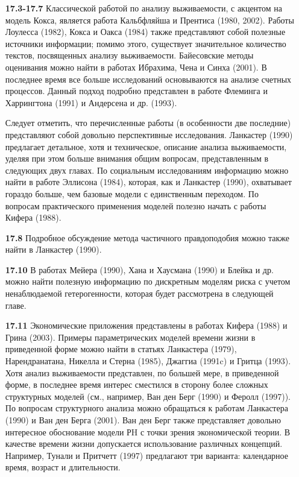 \begin{itemize}

    \item[\textbf{17.3-17.7}]
Классической работой по анализу выживаемости, с акцентом на модель Кокса, является работа Кальбфляйша и Прентиса (1980, 2002). Работы Лоулесса (1982), Кокса и Оакса (1984) также представляют собой полезные источники информации; помимо этого, существует значительное количество текстов, посвященных анализу выживаемости. Байесовские методы оценивания можно найти в работах Ибрахима, Чена и Синха (2001). В последнее время все больше исследований основываются на анализе счетных процессов. Данный подход подробно представлен в работе Флеминга и Харрингтона (1991) и Андерсена и др. (1993).

Следует отметить, что перечисленные работы (в особенности две последние) представляют собой довольно перспективные исследования. Ланкастер (1990) предлагает детальное, хотя и техническое, описание анализа выживаемости, уделяя при этом больше внимания общим вопросам, представленным в следующих двух главах. По социальным исследованиям информацию можно найти в работе Эллисона (1984), которая, как и Ланкастер (1990), охватывает гораздо больше, чем базовые модели с единственным переходом. По вопросам практического применения моделей полезно начать с работы Кифера (1988).

    \item[\textbf{17.8}]
Подробное обсуждение метода частичного правдоподобия можно также найти в Ланкастер (1990).

    \item[\textbf{17.10}]
В работах Мейера (1990), Хана и Хаусмана (1990) и Блейка и др. можно найти полезную информацию по дискретным моделям риска с учетом ненаблюдаемой гетерогенности, которая будет рассмотрена в следующей главе.

    \item[\textbf{17.11}]
Экономические приложения представлены в работах Кифера (1988) и Грина (2003). Примеры параметрических моделей времени жизни в приведенной форме можно найти в статьях Ланкастера (1979), Нарендранатана, Никелла и Стерна (1985), Джаггиа (1991c) и Гритца (1993). Хотя анализ выживаемости представлен, по большей мере, в приведенной форме, в последнее время интерес сместился в сторону более сложных структурных моделей (см., например, Ван ден Берг (1990) и Феролл (1997)). По вопросам структурного анализа можно обращаться к работам Ланкастера (1990) и Ван ден Берга (2001). Ван ден Берг также представляет довольно интересное обоснование модели РH с точки зрения экономической теории. В качестве времени жизни допускается использование различных концепций. Например, Тунали и Притчетт (1997) предлагают три варианта: календарное время, возраст и длительности.
\end{itemize}


